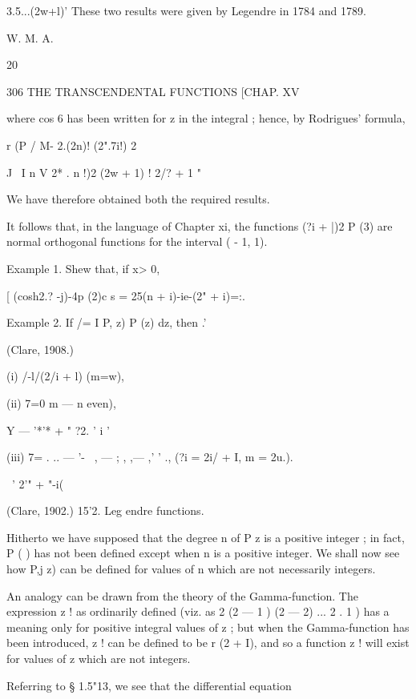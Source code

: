 {3.5...(2w+l)' These two results were given by Legendre in 1784 and
1789.



W. M. A.



20



306 THE TRANSCENDENTAL FUNCTIONS [CHAP. XV

where cos 6 has been written for z in the integral ; hence, by
Rodrigues' formula,

r (P / M- 2.(2n)! (2".7i!) 2



J \ I n V 2* . n !)2 (2w + 1) ! 2/? + 1 "

We have therefore obtained both the required results.

It follows that, in the language of Chapter xi, the functions (?i +
|)2 P (3) are normal orthogonal functions for the interval ( - 1, 1).

Example 1. Shew that, if x> 0,

[ (cosh2.? -j)-4p (2)c s = 25(n + i)-ie-(2" + i)=:.



Example 2. If /= I P, z) P (z) dz, then .'



(Clare, 1908.)



(i) /-l/(2/i + l) (m=w),

(ii) 7=0 m — n even),

Y — '*'* + " ?2. ' i '

(iii) 7= . .. — '-~ , — ; , ,— ,' ' ., (?i = 2i/ + I, m = 2u.).

\ ' 2'" + "-i(%

(Clare, 1902.) 15'2. Leg endre functions.

Hitherto we have supposed that the degree n of P z is a positive
integer ; in fact, P ( ) has not been defined except when n is a
positive integer. We shall now see how P,j z) can be defined for
values of n which are not necessarily integers.

An analogy can be drawn from the theory of the Gamma-function. The
expression z ! as ordinarily defined (viz. as 2 (2 — 1 ) (2 — 2) ... 2
. 1 ) has a meaning only for positive integral values of z ; but when
the Gamma-function has been introduced, z ! can be defined to be r (2
+ I), and so a function z ! will exist for values of z which are not
integers.

Referring to § 1.5"13, we see that the differential equation

}
